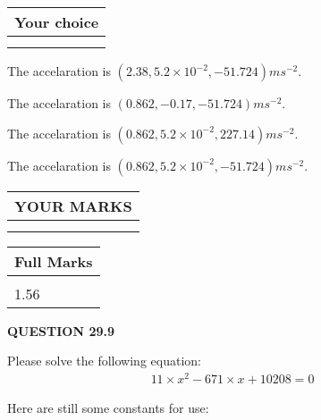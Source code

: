 \documentclass[12pt]{article}
\begin{document}
  
\noindent\hspace{3.0in} \begin{tabular}{|l|}
\hline
Your choice \\
\hline
 \\ 
 \\ 
\hline
\end{tabular}
  
  
 
 
  The accelaration is $  %
(
2.38,
5.2 \times 10^{-2},
-51.724)
ms^{-2} $.
 
 
  The accelaration is $  %
(
0.862,
-0.17,
-51.724)
ms^{-2} $.
 
 
  The accelaration is $  %
(
0.862,
5.2 \times 10^{-2},
227.14)
ms^{-2} $.
 
 
  The accelaration is $  %
(
0.862,
5.2 \times 10^{-2},
-51.724)
ms^{-2} $.
 
 
 

 
 
\vspace{0.3in}
  
\vspace{0.2in}
  
\noindent\begin{tabular}{|l|}
\hline
 YOUR MARKS  \\
\hline
 \\ 
 \\ 
\hline
\end{tabular}
\hspace{0.05in} \begin{tabular}{|l|}
\hline
 Full Marks  \\
\hline
 \\ 
1.56 \\
\hline
\end{tabular}
{\textbf{\Large{QUESTION
29.9 
}}}
  
  
 
 

 
Please solve the following equation:
\begin{eqnarray*}
11 \times x^2  %
-671
                 \times x    %
+  %
10208 =0
\end{eqnarray*}
 

 

 
\vspace{0.3in}
   
   
 \vspace{0.2in}
Here are still some constants for use:
 
\end{document}
